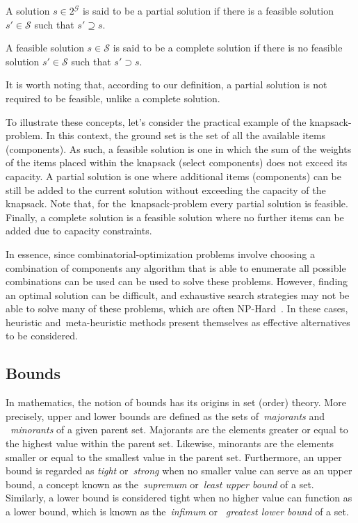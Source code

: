 \begin{definition}
  \label{def:partial-solution} A solution $s \in 2^\mathcal{G}$ is said to be a
  partial solution if there is a feasible solution $s' \in \mathcal{S}$ such
  that $s' \supseteq s$.
\end{definition}

\begin{definition}
  \label{def:complete-solution} A feasible solution $s \in \mathcal{S}$ is said
  to be a complete solution if there is no feasible solution $s' \in
    \mathcal{S}$ such that $s' \supset s$.
\end{definition}

It is worth noting that, according to our definition, a partial solution is not
required to be feasible, unlike a complete solution.

To illustrate these concepts, let's consider the practical example of the
\acrshort{knapsack-problem}. In this context, the ground set is the set of all
the available items (components). As such, a feasible solution is one in which
the sum of the weights of the items placed within the knapsack (select
components) does not exceed its capacity. A partial solution is one where
additional items (components) can be still be added to the current solution
without exceeding the capacity of the knapsack. Note that, for
the~\acrshort{knapsack-problem} every partial solution is feasible. Finally, a
complete solution is a feasible solution where no further items can be added due
to capacity constraints.

In essence, since \acrshort{combinatorial-optimization} problems involve
choosing a combination of components any algorithm that is able to enumerate all
possible combinations can be used can be used to solve these problems. However,
finding an optimal solution can be difficult, and exhaustive search strategies
may not be able to solve many of these problems, which are often
NP-Hard~\cite{yu2010combinatorial,festa2014brief}. In these cases, heuristic
and~\acrshort{meta-heuristic} methods present themselves as effective
alternatives to be considered.

\subsection{Bounds}
\label{subsec:bounds}

In mathematics, the notion of bounds has its origins in set (order) theory. More
precisely, upper and lower bounds are defined as the sets of~\textit{majorants}
and ~\textit{minorants} of a given parent set. Majorants are the
elements greater or equal to the highest value within the parent set.
Likewise, minorants are the elements smaller or equal to the smallest
value in the parent set. Furthermore, an upper bound is regarded as
\textit{tight} or~\textit{strong} when no smaller value can serve as an upper
bound, a concept known as the~\textit{supremum} or~\textit{least upper bound} of
a set. Similarly, a lower bound is considered tight when no higher value can
function as a lower bound, which is known as the~\textit{infimum} or
~\textit{greatest lower bound} of a set.


